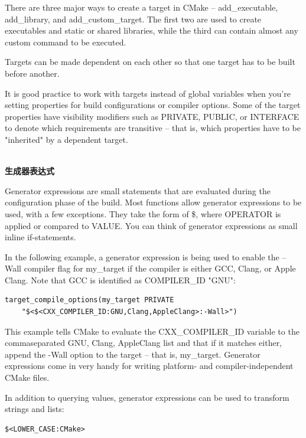 There are three major ways to create a target in CMake – add\_executable, add\_library, and add\_custom\_target. The first two are used to create executables and static or shared libraries, while the third can contain almost any custom command to be executed.

Targets can be made dependent on each other so that one target has to be built
before another.

It is good practice to work with targets instead of global variables when you're setting properties for build configurations or compiler options. Some of the target properties have visibility modifiers such as PRIVATE, PUBLIC, or INTERFACE to denote which requirements are transitive – that is, which properties have to be "inherited" by a dependent target.


\hspace*{\fill} \\ %
\noindent
\textbf{生成器表达式}

Generator expressions are small statements that are evaluated during the configuration phase of the build. Most functions allow generator expressions to be used, with a few exceptions. They take the form of \$<OPERATOR:VALUE>, where OPERATOR is applied or compared to VALUE. You can think of generator expressions as small inline if-statements.

In the following example, a generator expression is being used to enable the –Wall compiler flag for my\_target if the compiler is either GCC, Clang, or Apple Clang. Note that GCC is identified as COMPILER\_ID "GNU":

\begin{lstlisting}[style=styleCMake]
target_compile_options(my_target PRIVATE
	"$<$<CXX_COMPILER_ID:GNU,Clang,AppleClang>:-Wall>")
\end{lstlisting}

This example tells CMake to evaluate the CXX\_COMPILER\_ID variable to the commaseparated GNU, Clang, AppleClang list and that if it matches either, append the -Wall option to the target – that is, my\_target. Generator expressions come in very handy for writing platform- and compiler-independent CMake files. 

In addition to querying values, generator expressions can be used to transform strings and lists:

\begin{lstlisting}[style=styleCMake]
$<LOWER_CASE:CMake>
\end{lstlisting}

